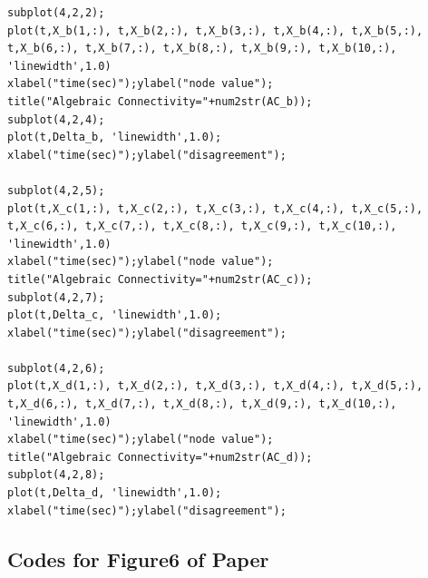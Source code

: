 \documentclass{article}
\begin{document}
\begin{lstlisting}
subplot(4,2,2);
plot(t,X_b(1,:), t,X_b(2,:), t,X_b(3,:), t,X_b(4,:), t,X_b(5,:), t,X_b(6,:), t,X_b(7,:), t,X_b(8,:), t,X_b(9,:), t,X_b(10,:), 'linewidth',1.0)
xlabel("time(sec)");ylabel("node value");
title("Algebraic Connectivity="+num2str(AC_b));
subplot(4,2,4);
plot(t,Delta_b, 'linewidth',1.0);
xlabel("time(sec)");ylabel("disagreement");

subplot(4,2,5);
plot(t,X_c(1,:), t,X_c(2,:), t,X_c(3,:), t,X_c(4,:), t,X_c(5,:), t,X_c(6,:), t,X_c(7,:), t,X_c(8,:), t,X_c(9,:), t,X_c(10,:), 'linewidth',1.0)
xlabel("time(sec)");ylabel("node value");
title("Algebraic Connectivity="+num2str(AC_c));
subplot(4,2,7);
plot(t,Delta_c, 'linewidth',1.0);
xlabel("time(sec)");ylabel("disagreement");

subplot(4,2,6);
plot(t,X_d(1,:), t,X_d(2,:), t,X_d(3,:), t,X_d(4,:), t,X_d(5,:), t,X_d(6,:), t,X_d(7,:), t,X_d(8,:), t,X_d(9,:), t,X_d(10,:), 'linewidth',1.0)
xlabel("time(sec)");ylabel("node value");
title("Algebraic Connectivity="+num2str(AC_d));
subplot(4,2,8);
plot(t,Delta_d, 'linewidth',1.0);
xlabel("time(sec)");ylabel("disagreement");
\end{lstlisting}

\subsection*{Codes for Figure6 of Paper}
\end{document}
